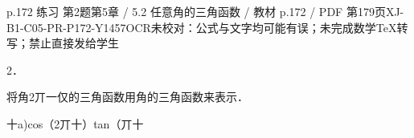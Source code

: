 \begin{bankitem}{p.172 练习 第2题}{第5章 / 5.2 任意角的三角函数 / 教材 p.172 / PDF 第179页}{XJ-B1-C05-PR-P172-Y1457}{OCR未校对：公式与文字均可能有误；未完成数学TeX转写；禁止直接发给学生}
\begin{ocrdraft}
\par
2．
\par
将角2丌一仅的三角函数用角的三角函数来表示．
\par
十a)cos（2丌十）tan（丌十
\end{ocrdraft}
\end{bankitem}
